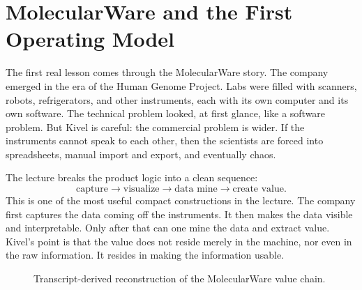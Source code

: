 \section{MolecularWare and the First Operating Model}

The first real lesson comes through the MolecularWare story. The company emerged in the era of the Human Genome Project. Labs were filled with scanners, robots, refrigerators, and other instruments, each with its own computer and its own software. The technical problem looked, at first glance, like a software problem. But Kivel is careful: the commercial problem is wider. If the instruments cannot speak to each other, then the scientists are forced into spreadsheets, manual import and export, and eventually chaos.

The lecture breaks the product logic into a clean sequence:
\begin{equation}
\text{capture} \to \text{visualize} \to \text{data mine} \to \text{create value}.
\end{equation}
This is one of the most useful compact constructions in the lecture. The company first captures the data coming off the instruments. It then makes the data visible and interpretable. Only after that can one mine the data and extract value. Kivel's point is that the value does not reside merely in the machine, nor even in the raw information. It resides in making the information usable.

\begin{figure}[htbp]
\centering
{}
\caption{Transcript-derived reconstruction of the MolecularWare value chain.}
\end{figure}

